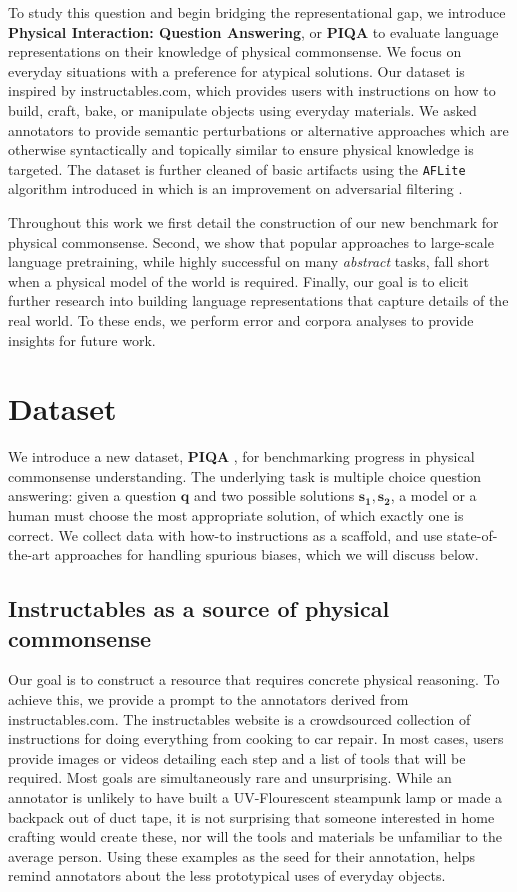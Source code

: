 To study this question and begin bridging the representational gap, we introduce \textbf{Physical Interaction: Question Answering}, or \textbf{PIQA} \raisebox{-0.3pt} to evaluate language representations on their knowledge of physical commonsense.  We focus on everyday situations with a preference for atypical solutions. Our dataset is inspired by instructables.com,  which provides users with instructions on how to build, craft, bake, or manipulate objects using everyday materials.  We asked annotators to provide semantic perturbations or alternative approaches which are otherwise syntactically and topically similar to ensure physical knowledge is targeted.  The dataset is further cleaned of basic artifacts using the \texttt{AFLite} algorithm introduced in \cite{Sakaguchi2019WINOGRANDEAA,Sap2019} which is an improvement on adversarial filtering \cite{Zellers2018,Zellers2019b}. 

Throughout this work we first detail the construction of our new benchmark for physical commonsense. Second, we show that popular approaches to large-scale language pretraining, while highly successful on many \emph{abstract} tasks, fall short when a physical model of the world is required. Finally, our goal is to elicit further research into building language representations that capture details of the real world.  To these ends, we perform error and corpora analyses to provide insights for future work.

\section{Dataset}
We introduce a new dataset, \textbf{PIQA} \raisebox{-0.3pt}, for benchmarking progress in physical commonsense understanding. The underlying task is multiple choice question answering: given a question $\boldsymbol{q}$ and two possible solutions $\boldsymbol{s_1}, \boldsymbol{s_2}$, a model or a human must choose the most appropriate solution, of which exactly one is correct. We collect data with how-to instructions as a scaffold, and use state-of-the-art approaches for handling spurious biases, which we will discuss below.

\subsection{Instructables as a source of physical commonsense} Our goal is to construct a resource that requires concrete physical reasoning. To achieve this, we provide a prompt to the annotators derived from instructables.com. The instructables website is a crowdsourced collection of instructions for doing everything from cooking to car repair.  In most cases, users provide images or videos detailing each step and a list of tools that will be required.  Most goals are simultaneously rare and unsurprising.  While an annotator is unlikely to have built a UV-Flourescent steampunk lamp or made a backpack out of duct tape, it is not surprising that someone interested in home crafting would create these, nor will the tools and materials be unfamiliar to the average person. Using these examples as the seed for their annotation, helps remind annotators about the less prototypical uses of everyday objects.

